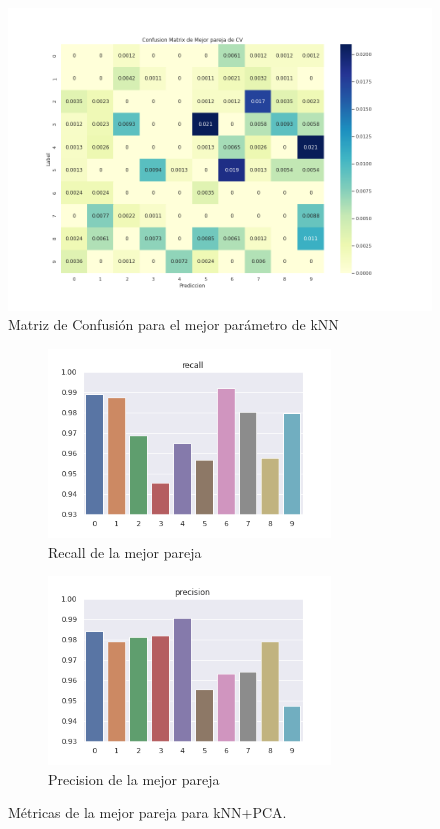 \begin{figure}[H]
    \centering
    \includegraphics[width=14cm]{images/ConfMatrix_knnpca.png}%
    \qquad
    \caption{Matriz de Confusión para el mejor parámetro de kNN }
    \label{knnpca_MatrizConf}%
\end{figure}

\begin{figure}[h]
\begin{subfigure}{0.5\textwidth}
\includegraphics[width=0.9\linewidth, height=5cm]{images/recall_knnpca.png} 
\caption{Recall de la mejor pareja}
\label{fig:metpca1}
\end{subfigure}
\begin{subfigure}{0.5\textwidth}
\includegraphics[width=0.9\linewidth, height=5cm]{images/precision_knnpca.png} 
\caption{Precision de la mejor pareja}
\label{fig:metpca2}
\end{subfigure}
\caption{Métricas de la mejor pareja para kNN+PCA.}
\label{knnpca_metricas}%
\end{figure}


